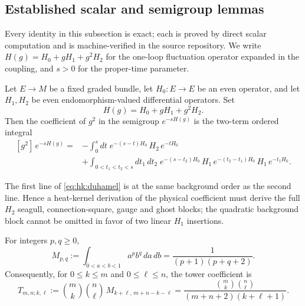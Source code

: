 \subsection{Established scalar and semigroup lemmas}\label{subsec:hk:lemmas}

Every identity in this subsection is exact; each is proved by direct scalar
computation and is machine-verified in the source repository. We write
$H(g)=H_0+gH_1+g^2H_2$ for the one-loop fluctuation operator expanded in the
coupling, and $s>0$ for the proper-time parameter.

\begin{lemma}\label{lem:hk:duhamel}
Let $E\to M$ be a fixed graded bundle, let $H_0:E\to E$ be an even operator,
and let $H_1,H_2$ be even endomorphism-valued differential operators. Set
\begin{equation}\label{eq:hk:Hg}
H(g)=H_0+gH_1+g^2H_2 .
\end{equation}
Then the coefficient of $g^2$ in the semigroup $e^{-sH(g)}$ is the two-term
ordered integral
\begin{equation}\label{eq:hk:duhamel}
\begin{aligned}
[g^2]\,e^{-sH(g)}
={}&-\int_0^s dt\; e^{-(s-t)H_0}\,H_2\,e^{-tH_0} \\
&+\int_{0<t_1<t_2<s} dt_1\,dt_2\;
e^{-(s-t_2)H_0}\,H_1\,e^{-(t_2-t_1)H_0}\,H_1\,e^{-t_1H_0} .
\end{aligned}
\end{equation}
\end{lemma}

\begin{remark}
The first line of \eqref{eq:hk:duhamel} is at the same background order as the
second line. Hence a heat-kernel derivation of the physical coefficient must
derive the full $H_2$ seagull, connection-square, gauge and ghost blocks; the
quadratic background block cannot be omitted in favor of two linear $H_1$
insertions.
\end{remark}

\begin{lemma}\label{lem:hk:simplex}
For integers $p,q\ge0$,
\begin{equation}\label{eq:hk:simplex}
M_{p,q}:=\int_{0<a<b<1} a^p b^q \,da\,db
=\frac{1}{(p+1)(p+q+2)} .
\end{equation}
Consequently, for $0\le k\le m$ and $0\le\ell\le n$, the tower coefficient is
\begin{equation}\label{eq:hk:tower}
T_{m,n;k,\ell}
:=\binom{m}{k}\binom{n}{\ell}\,M_{k+\ell,\,m+n-k-\ell}
=\frac{\binom{m}{k}\binom{n}{\ell}}{(m+n+2)(k+\ell+1)} .
\end{equation}
\end{lemma}

